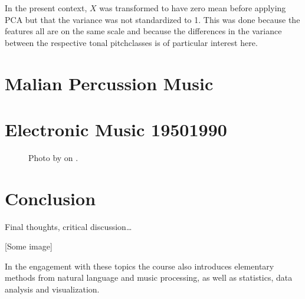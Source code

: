 \documentclass[letterpaper,10pt,english]{sphinxmanual}
\begin{document}
In the present context, \(X\) was transformed to have zero mean before applying PCA
but that the variance was not standardized to 1.
This was done because the features all are on the same scale and because the
differences in the variance between the respective tonal pitch\sphinxhyphen{}classes is of particular
interest here.


\chapter{Malian Percussion Music}
\label{\detokenize{mali_percussion:malian-percussion-music}}\label{\detokenize{mali_percussion::doc}}

\chapter{Electronic Music 1950\sphinxhyphen{}1990}
\label{\detokenize{electronic:electronic-music-1950-1990}}\label{\detokenize{electronic::doc}}
\begin{figure}[htbp]
\centering
\capstart

\noindent{}
\caption{Photo by 
on .}\label{\detokenize{electronic:id1}}\end{figure}


\chapter{Conclusion}
\label{\detokenize{conclusion:conclusion}}\label{\detokenize{conclusion::doc}}
Final thoughts, critical discussion…

{[}Some image{]}



In the engagement with these topics the course also introduces elementary methods from natural language and music processing,
as well as statistics, data analysis and visualization.
\end{document}
